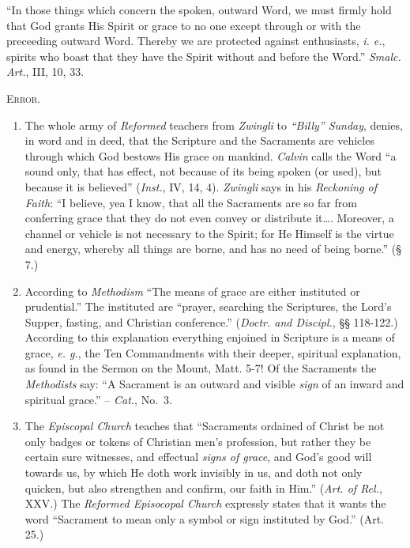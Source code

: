 \documentclass[
]{book}
\begin{document}
``In those things which concern the spoken, outward Word, we must firmly hold that God grants His Spirit or grace to no one except through or with the preceeding outward Word. Thereby we are protected against enthusiasts, \emph{i. e.}, spirits who boast that they have the Spirit without and before the Word.'' \emph{Smalc. Art.}, III, 10, 33.

\begin{center}
\textsc{Error.}
\end{center}

\begin{enumerate}
\def\labelenumi{\arabic{enumi}.}
\item
  The whole army of \emph{Reformed} teachers from \emph{Zwingli} to \emph{``Billy'' Sunday}, denies, in word and in deed, that the Scripture and the Sacraments are vehicles through which God bestows His grace on mankind. \emph{Calvin} calls the Word ``a sound only, that has effect, not because of its being spoken (or used), but because it is believed'' (\emph{Inst.}, IV, 14, 4). \emph{Zwingli} says in his \emph{Reckoning of Faith}: ``I believe, yea I know, that all the Sacraments are so far from conferring grace that they do not even convey or distribute it\ldots. Moreover, a channel or vehicle is not necessary to the Spirit; for He Himself is the virtue and energy, whereby all things are borne, and has no need of being borne.'' (§ 7.)
\item
  According to \emph{Methodism} ``The means of grace are either instituted or prudential.'' The instituted are ``prayer, searching the Scriptures, the Lord's Supper, fasting, and Christian conference.'' (\emph{Doctr. and Discipl.}, §§ 118-122.) According to this explanation everything enjoined in Scripture is a means of grace, \emph{e. g.}, the Ten Commandments with their deeper, spiritual explanation, as found in the Sermon on the Mount, Matt. 5-7! Of the Sacraments the \emph{Methodists} say: ``A Sacrament is an outward and visible \emph{sign} of an inward and spiritual grace.'' -- \emph{Cat.}, No.~3.
\item
  The \emph{Episcopal Church} teaches that ``Sacraments ordained of Christ be not only badges or tokens of Christian men's profession, but rather they be certain sure witnesses, and effectual \emph{signs of grace}, and God's good will towards us, by which He doth work invisibly in us, and doth not only quicken, but also strengthen and confirm, our faith in Him.'' (\emph{Art. of Rel.}, XXV.) The \emph{Reformed Episocopal Church} expressly states that it wants the word ``Sacrament to mean only a symbol or sign instituted by God.'' (Art. 25.)

\end{enumerate}
\end{document}
